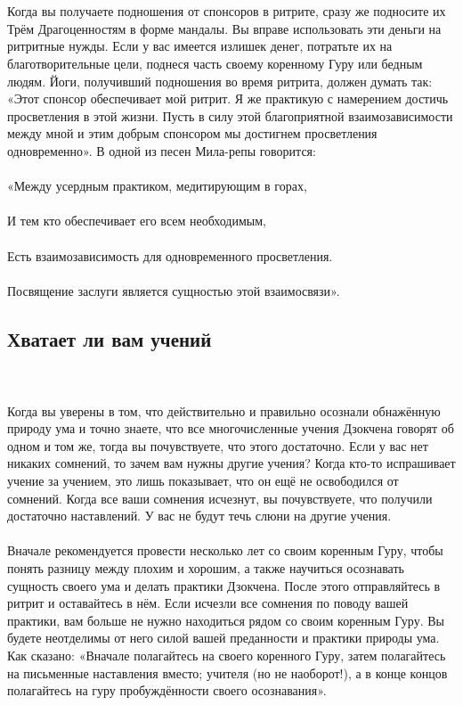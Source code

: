 \\ \\ Когда вы получаете подношения от спонсоров в ритрите, сразу же подносите их Трём Драгоценностям в форме мандалы. Вы вправе использовать эти деньги на ритритные нужды. Если у вас имеется излишек денег, потратьте их на благотворительные цели, поднеся часть своему коренному Гуру или бедным людям. Йоги, получивший подношения во время ритрита, должен думать так: «Этот спонсор обеспечивает мой ритрит. Я же практикую с намерением достичь просветления в этой жизни. Пусть в силу этой благоприятной взаимозависимости между мной и этим добрым спонсором мы достигнем просветления одновременно». В одной из песен Мила-репы говорится:
\\ \\  «Между усердным практиком, медитирующим в горах, 
\\ \\ И тем кто обеспечивает его всем необходимым, 
\\ \\ Есть взаимозависимость для одновременного просветления. 
\\ \\ Посвящение заслуги является сущностью этой взаимосвязи».
\subsection{Хватает ли вам учений}
\\ \\ Когда вы уверены в том, что действительно и правильно осознали обнажённую природу ума и точно знаете, что все многочисленные учения Дзокчена говорят об одном и том же, тогда вы почувствуете, что этого достаточно. Если у вас нет никаких сомнений, то зачем вам нужны другие учения? Когда кто-то испрашивает учение за учением, это лишь показывает, что он ещё не освободился от сомнений. Когда все ваши сомнения исчезнут, вы почувствуете, что получили достаточно наставлений. У вас не будут течь слюни на другие учения.
\\ \\ Вначале рекомендуется провести несколько лет со своим коренным Гуру, чтобы понять разницу между плохим и хорошим, а также научиться осознавать сущность своего ума и делать практики Дзокчена. После этого отправляйтесь в ритрит и оставайтесь в нём. Если исчезли все сомнения по поводу вашей практики, вам больше не нужно находиться рядом со своим коренным Гуру. Вы будете неотделимы от него силой вашей преданности и практики природы ума. Как сказано: «Вначале полагайтесь на своего коренного Гуру, затем полагайтесь на письменные наставления вместо; учителя (но не наоборот!), а в конце концов полагайтесь на гуру пробуждённости своего осознавания».
